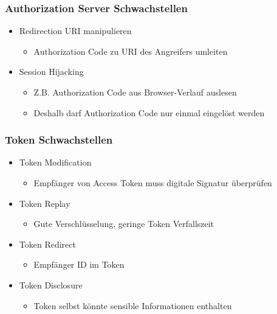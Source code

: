 \documentclass{beamer}
\begin{document}
\begin{frame}
\frametitle{Authorization Server Schwachstellen}
\begin{itemize}
\item Redirection URI manipulieren
	\begin{itemize}
	\item Authorization Code zu URI des Angreifers umleiten
	\end{itemize}
\item Session Hijacking
	\begin{itemize}
	\item Z.B. Authorization Code aus Browser-Verlauf auslesen
	\item Deshalb darf Authorization Code nur einmal eingelöst werden %
	\end{itemize}
\end{itemize}
\end{frame}

\begin{frame}
\frametitle{Token Schwachstellen}
\begin{itemize}
\item Token Modification
	\begin{itemize}
	\item Empfänger von Access Token muss digitale Signatur überprüfen
	\end{itemize}
\item Token Replay
	\begin{itemize}
	\item Gute Verschlüsselung, geringe Token Verfallszeit
	\end{itemize}
\item Token Redirect
	\begin{itemize}
	\item Empfänger ID im Token %
	\end{itemize}
\item Token Disclosure
	\begin{itemize}
	\item Token selbst könnte sensible Informationen enthalten
	\end{itemize}
\end{itemize}
\end{frame}
\end{document}
